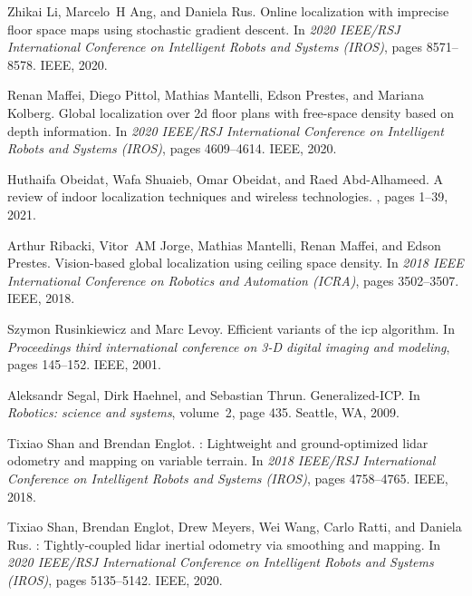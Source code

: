 \documentclass[letterpaper, 10 pt, conference]{ieeeconf}  %
\begin{document}
\begin{thebibliography}{10}
  Zhikai Li, Marcelo~H Ang, and Daniela Rus.
  \newblock Online localization with imprecise floor space maps using stochastic
    gradient descent.
  \newblock In {\em 2020 IEEE/RSJ International Conference on Intelligent Robots
    and Systems (IROS)}, pages 8571--8578. IEEE, 2020.
  
  Renan Maffei, Diego Pittol, Mathias Mantelli, Edson Prestes, and Mariana
    Kolberg.
  \newblock Global localization over 2d floor plans with free-space density based
    on depth information.
  \newblock In {\em 2020 IEEE/RSJ International Conference on Intelligent Robots
    and Systems (IROS)}, pages 4609--4614. IEEE, 2020.
  
  Huthaifa Obeidat, Wafa Shuaieb, Omar Obeidat, and Raed Abd-Alhameed.
  \newblock A review of indoor localization techniques and wireless technologies.
  , pages 1--39, 2021.
  
  Arthur Ribacki, Vitor~AM Jorge, Mathias Mantelli, Renan Maffei, and Edson
    Prestes.
  \newblock Vision-based global localization using ceiling space density.
  \newblock In {\em 2018 IEEE International Conference on Robotics and Automation
    (ICRA)}, pages 3502--3507. IEEE, 2018.
  
  Szymon Rusinkiewicz and Marc Levoy.
  \newblock Efficient variants of the icp algorithm.
  \newblock In {\em Proceedings third international conference on 3-D digital
    imaging and modeling}, pages 145--152. IEEE, 2001.
  
  Aleksandr Segal, Dirk Haehnel, and Sebastian Thrun.
  \newblock Generalized-{ICP}.
  \newblock In {\em Robotics: science and systems}, volume~2, page 435. Seattle,
    WA, 2009.
  
  Tixiao Shan and Brendan Englot.
  : Lightweight and ground-optimized lidar odometry and
    mapping on variable terrain.
  \newblock In {\em 2018 IEEE/RSJ International Conference on Intelligent Robots
    and Systems (IROS)}, pages 4758--4765. IEEE, 2018.
  
  Tixiao Shan, Brendan Englot, Drew Meyers, Wei Wang, Carlo Ratti, and Daniela
    Rus.
  : Tightly-coupled lidar inertial odometry via smoothing and
    mapping.
  \newblock In {\em 2020 IEEE/RSJ International Conference on Intelligent Robots
    and Systems (IROS)}, pages 5135--5142. IEEE, 2020.
  

\end{thebibliography}
\end{document}

